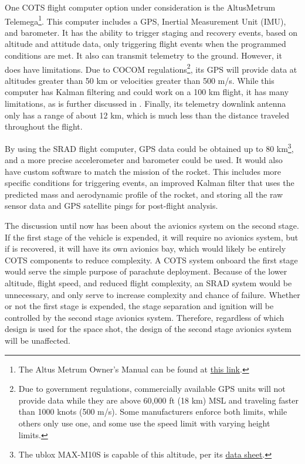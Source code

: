 One COTS flight computer option under consideration is the AltusMetrum Telemega\footnote{The Altus Metrum Owner's Manual can be found at \href{https://altusmetrum.org/AltOS/doc/altusmetrum.pdf}{this link}.}. This computer includes a GPS, Inertial Measurement Unit (IMU), and barometer.  It has the ability to trigger staging and recovery events, based on altitude and attitude data, only triggering flight events when the programmed conditions are met. It also can transmit telemetry to the ground. However, it does have limitations. Due to COCOM regulations\footnote{Due to government regulations, commercially available GPS units will not provide data while they are above 60,000 ft (18 km) MSL and traveling faster than 1000 knots (500 m/s). Some manufacturers enforce both limits, while others only use one, and some use the speed limit with varying height limits.}, its GPS will provide data at altitudes greater than 50 km or velocities greater than 500 m/s. While this computer has Kalman filtering and could work on a 100 km flight, it has many limitations, as is further discussed in . Finally, its telemetry downlink antenna only has a range of about 12 km, which is much less than the distance traveled throughout the flight.

By using the SRAD flight computer, GPS data could be obtained up to 80 km\footnote{The ublox MAX-M10S is capable of this altitude, per its \href{https://content.u-blox.com/sites/default/files/MAX-M10S_DataSheet_UBX-20035208.pdf}{data sheet}.}, and a more precise accelerometer and barometer could be used. It would also have custom software to match the mission of the rocket. This includes more specific conditions for triggering events, an improved Kalman filter that uses the predicted mass and aerodynamic profile of the rocket, and storing all the raw sensor data and GPS satellite pings for post-flight analysis.

The discussion until now has been about the avionics system on the second stage. If the first stage of the vehicle is expended, it will require no avionics system, but if is recovered, it will have its own avionics bay, which would likely be entirely COTS components to reduce complexity. A COTS system onboard the first stage would serve the simple purpose of parachute deployment. Because of the lower altitude, flight speed, and reduced flight complexity, an SRAD system would be unnecessary, and only serve to increase complexity and chance of failure. Whether or not the first stage is expended, the stage separation and ignition will be controlled by the second stage avionics system. Therefore, regardless of which design is used for the space shot, the design of the second stage avionics system will be unaffected.


